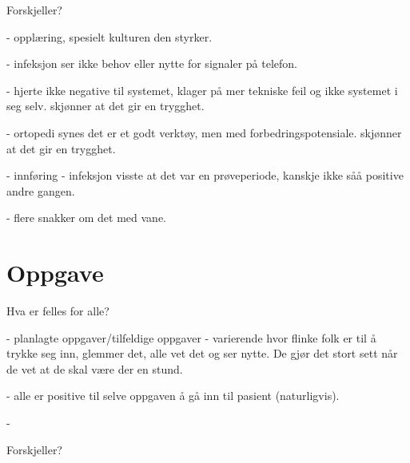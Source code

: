 Forskjeller?

- opplæring, spesielt kulturen den styrker.

- infeksjon ser ikke behov eller nytte for signaler på telefon.

- hjerte ikke negative til systemet, klager på mer tekniske feil og ikke systemet i seg selv. skjønner at det gir en trygghet.

- ortopedi synes det er et godt verktøy, men med forbedringspotensiale. skjønner at det gir en trygghet.

- innføring - infeksjon visste at det var en prøveperiode, kanskje ikke såå positive andre gangen.

- flere snakker om det med vane.

\section{Oppgave}
Hva er felles for alle?

- planlagte oppgaver/tilfeldige oppgaver
- varierende hvor flinke folk er til å trykke seg inn, glemmer det, alle vet det og ser nytte. De gjør det stort sett når de vet at de skal være der en stund.

- alle er positive til selve oppgaven å gå inn til pasient (naturligvis). 



- 

Forskjeller?
 



